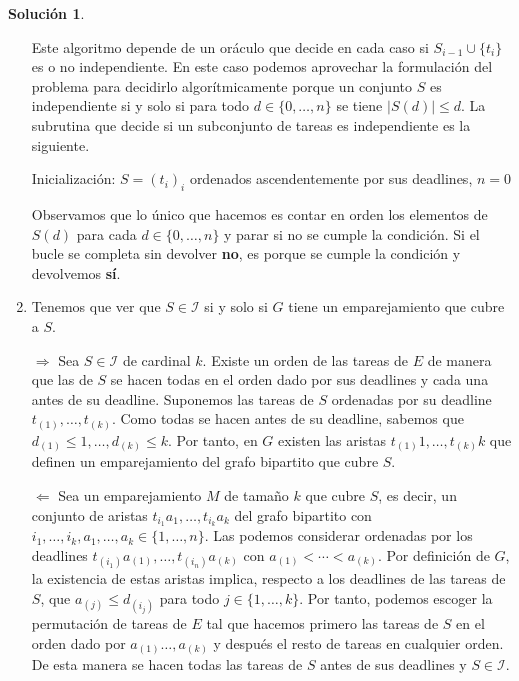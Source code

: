 \documentclass[10pt]{article}
\theoremstyle{definition}
\newtheorem*{sol}{Solución}
\begin{document}
\begin{sol}
\begin{enumerate}[labelindent=\parindent, label=(\alph*), ref=\alph*]
\begin{algorithm}[H]
{ }
\end{algorithm}
Este algoritmo depende de un oráculo que decide en cada caso si $S_{i-1}\cup\{t_i\}$ es o no independiente. En este caso podemos aprovechar la formulación del problema para decidirlo algorítmicamente porque un conjunto $S$ es independiente si y solo si para todo $d\in\{0,\ldots,n\}$ se tiene $|S(d)|\leq d$. La subrutina que decide si un subconjunto de tareas es independiente es la siguiente.

\begin{algorithm}[H]
\SetAlgoLined\DontPrintSemicolon
{}
 Inicialización: $S=(t_i)_i$ ordenados ascendentemente por sus deadlines, $n=0$\;
 \;
\end{algorithm}
Observamos que lo único que hacemos es contar en orden los elementos de $S(d)$ para cada $d\in\{0,\ldots,n\}$ y parar si no se cumple la condición. Si el bucle se completa sin devolver \textbf{no}, es porque se cumple la condición y devolvemos \textbf{sí}.
\item Tenemos que ver que $S\in\mathcal{I}$ si y solo si $G$ tiene un emparejamiento que cubre a $S$.

$\Longrightarrow$ Sea $S\in\mathcal{I}$ de cardinal $k$. Existe un orden de las tareas de $E$ de manera que las de $S$ se hacen todas en el orden dado por sus deadlines y cada una antes de su deadline. Suponemos las tareas de $S$ ordenadas por su deadline $t_{(1)},\ldots,t_{(k)}$. Como todas se hacen antes de su deadline, sabemos que $d_{(1)}\leq 1,\ldots,d_{(k)}\leq k$. Por tanto, en $G$ existen las aristas $t_{(1)}1,\ldots,t_{(k)}k$ que definen un emparejamiento del grafo bipartito que cubre $S$.

$\Longleftarrow$ Sea un emparejamiento $M$ de tamaño $k$ que cubre $S$, es decir, un conjunto de aristas $t_{i_1}a_1,\ldots, t_{i_k}a_k$ del grafo bipartito con $i_1,\ldots,i_k,a_1,\ldots,a_k\in\{1,\ldots,n\}$. Las podemos considerar ordenadas por los deadlines $t_{(i_1)}a_{(1)},\ldots,t_{(i_{n})}a_{(k)}$ con $a_{(1)}<\cdots<a_{(k)}$. Por definición de $G$, la existencia de estas aristas implica, respecto a los deadlines de las tareas de $S$, que $a_{(j)}\leq d_{(i_j)}$ para todo $j\in\{1,\ldots,k\}$. Por tanto, podemos escoger la permutación de tareas de $E$ tal que hacemos primero las tareas de $S$ en el orden dado por $a_{(1)}\ldots,a_{(k)}$ y después el resto de tareas en cualquier orden. De esta manera se hacen todas las tareas de $S$ antes de sus deadlines y $S\in\mathcal{I}$.
\end{enumerate}
\end{sol}
\end{document}
